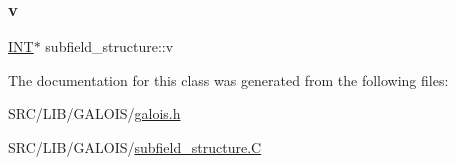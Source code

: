\subsubsection{\texorpdfstring{v}{v}}
{\footnotesize\ttfamily \mbox{\hyperlink{galois_8h_a09fddde158a3a20bd2dcadb609de11dc}{I\+NT}}$\ast$ subfield\+\_\+structure\+::v}



The documentation for this class was generated from the following files\+:\begin{DoxyCompactItemize}
\item 
S\+R\+C/\+L\+I\+B/\+G\+A\+L\+O\+I\+S/\mbox{\hyperlink{galois_8h}{galois.\+h}}\item 
S\+R\+C/\+L\+I\+B/\+G\+A\+L\+O\+I\+S/\mbox{\hyperlink{subfield__structure_8_c}{subfield\+\_\+structure.\+C}}\end{DoxyCompactItemize}
